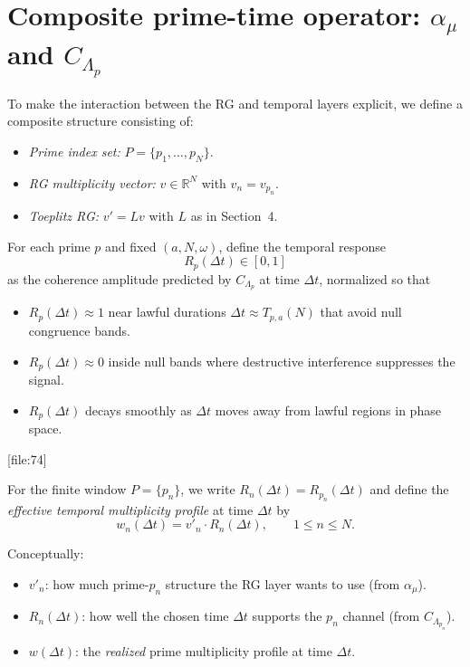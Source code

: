 \documentclass[11pt]{article}
\begin{document}
\section{Composite prime-time operator: $\alpha_\mu$ and $C_{\Lambda_p}$}

To make the interaction between the RG and temporal layers explicit, we define a composite structure consisting of:
\begin{itemize}
    \item \emph{Prime index set:} $P = \{p_1,\dots,p_N\}$.
    \item \emph{RG multiplicity vector:} $v \in \mathbb{R}^N$ with $v_n = v_{p_n}$.
    \item \emph{Toeplitz RG:} $v' = L v$ with $L$ as in Section~4.
\end{itemize}

For each prime $p$ and fixed $(a,N,\omega)$, define the temporal response
\begin{equation}
    R_p(\Delta t) \in [0,1]
\end{equation}
as the coherence amplitude predicted by $C_{\Lambda_p}$ at time $\Delta t$, normalized so that
\begin{itemize}
    \item $R_p(\Delta t) \approx 1$ near lawful durations $\Delta t \approx T_{p,a}(N)$ that avoid null congruence bands.
    \item $R_p(\Delta t) \approx 0$ inside null bands where destructive interference suppresses the signal.
    \item $R_p(\Delta t)$ decays smoothly as $\Delta t$ moves away from lawful regions in phase space.
\end{itemize}[file:74]

For the finite window $P = \{p_n\}$, we write $R_n(\Delta t) = R_{p_n}(\Delta t)$ and define the \emph{effective temporal multiplicity profile} at time $\Delta t$ by
\begin{equation}
    w_n(\Delta t) = v'_n \cdot R_n(\Delta t), \qquad 1 \le n \le N.
\end{equation}

Conceptually:
\begin{itemize}
    \item $v'_n$: how much prime-$p_n$ structure the RG layer wants to use (from $\alpha_\mu$).
    \item $R_n(\Delta t)$: how well the chosen time $\Delta t$ supports the $p_n$ channel (from $C_{\Lambda_{p_n}}$).
    \item $w(\Delta t)$: the \emph{realized} prime multiplicity profile at time $\Delta t$.
\end{itemize}
\end{document}
